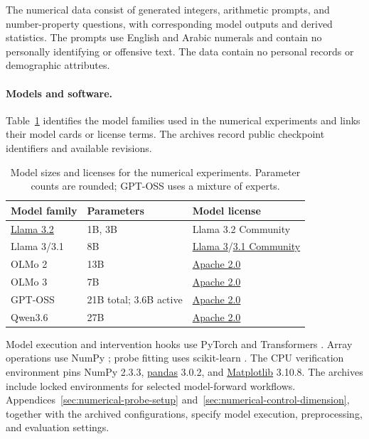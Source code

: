 \documentclass[11pt]{article}
\begin{document}
The numerical data consist of generated integers, arithmetic prompts, and number-property questions, with corresponding model outputs and derived statistics.
The prompts use English and Arabic numerals and contain no personally identifying or offensive text.
The data contain no personal records or demographic attributes.

\paragraph{Models and software.}

Table~\ref{tab:experimental-models} identifies the model families used in the numerical experiments and links their model cards or license terms.
The archives record public checkpoint identifiers and available revisions.

\begin{table}[H]
\centering
\small
\setlength{\tabcolsep}{3pt}
\renewcommand{\arraystretch}{1.08}
\begin{tabularx}{\linewidth}{@{}>{\raggedright\arraybackslash}p{.42\linewidth}>{\raggedright\arraybackslash}p{.18\linewidth}>{\raggedright\arraybackslash}X@{}}
\toprule
Model family & Parameters & Model license \\
\midrule
\href{https://huggingface.co/meta-llama/Llama-3.2-1B}{Llama 3.2} & 1B, 3B & Llama 3.2 Community \\
Llama 3/3.1 \citep{grattafiori2024llama} & 8B & \href{https://huggingface.co/meta-llama/Meta-Llama-3-8B}{Llama 3}/\href{https://huggingface.co/meta-llama/Llama-3.1-8B}{3.1 Community} \\
OLMo 2 \citep{teamolmo2025olmo2} & 13B & \href{https://huggingface.co/allenai/OLMo-2-1124-13B}{Apache 2.0} \\
OLMo 3 \citep{teamolmo2026olmo3} & 7B & \href{https://huggingface.co/allenai/Olmo-3-1025-7B}{Apache 2.0} \\
GPT-OSS \citep{openai2025gptoss} & 21B total; 3.6B active & \href{https://huggingface.co/openai/gpt-oss-20b}{Apache 2.0} \\
Qwen3.6 \citep{qwen2026qwen36} & 27B & \href{https://huggingface.co/Qwen/Qwen3.6-27B}{Apache 2.0} \\
\bottomrule
\end{tabularx}
\caption{Model sizes and licenses for the numerical experiments.
Parameter counts are rounded; GPT-OSS uses a mixture of experts.}
\label{tab:experimental-models}
\end{table}

Model execution and intervention hooks use PyTorch \citep{paszke2019pytorch} and Transformers \citep{wolf2020transformers}.
Array operations use NumPy \citep{harris2020numpy}; probe fitting uses scikit-learn \citep{pedregosa2011scikit}.
The CPU verification environment pins NumPy 2.3.3, \href{https://pandas.pydata.org/}{pandas} 3.0.2, and \href{https://matplotlib.org/}{Matplotlib} 3.10.8.
The archives include locked environments for selected model-forward workflows.
Appendices~\ref{sec:numerical-probe-setup} and~\ref{sec:numerical-control-dimension}, together with the archived configurations, specify model execution, preprocessing, and evaluation settings.
\end{document}
